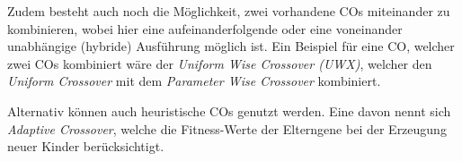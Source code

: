 	Zudem besteht auch noch die Möglichkeit, zwei vorhandene COs miteinander zu kombinieren, wobei hier eine aufeinanderfolgende oder eine voneinander unabhängige (hybride) Ausführung möglich ist. Ein Beispiel für eine CO, welcher zwei COs kombiniert wäre der \textit{Uniform Wise Crossover (UWX)}, welcher den \textit{Uniform Crossover} mit dem \textit{Parameter Wise Crossover} kombiniert. \cite{ElectromagneticRealEncoding}
	
	Alternativ können auch heuristische COs genutzt werden. Eine davon nennt sich \textit{Adaptive Crossover}, welche die Fitness-Werte der Elterngene bei der Erzeugung neuer Kinder berücksichtigt.